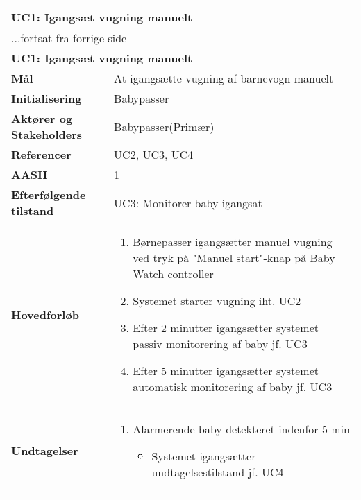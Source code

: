 \begin{center} \centering \label{kravspec:uc1}
	\begin{longtable}{|p{5cm}|p{9cm}|}  %
	\hline
		\multicolumn{2}{|l|}{\textbf{UC1: Igangsæt vugning manuelt}} \\\hline %
		\endfirsthead
		
		\multicolumn{2}{l}{...fortsat fra forrige side} \\ \hline %
		\multicolumn{2}{|l|}{\textbf{UC1: Igangsæt vugning manuelt}} \\\hline %
		\endhead	
		
		\textbf{Mål}							&At igangsætte vugning af barnevogn manuelt 		\\\hline
		\textbf{Initialisering}				&Babypasser		\\\hline
		\textbf{Aktører og Stakeholders}		&Babypasser(Primær)		\\\hline 
		\textbf{Referencer}					&UC2, UC3, UC4		\\\hline
		\textbf{AASH}						&1		\\\hline
		\textbf{Efterfølgende tilstand}		&UC3: Monitorer baby igangsat		\\\hline
		\textbf{Hovedforløb}					
			&\begin{enumerate}
	
				\item Børnepasser igangsætter manuel vugning ved tryk på "Manuel start"-knap på Baby Watch controller
				
				\item \label{kravspec:uc1_vugning}Systemet starter vugning iht. UC2
				
				\item \label{kravspec:uc1_timeout2}Efter 2 minutter igangsætter systemet passiv monitorering af baby jf. UC3			
								
				\item \label{kravspec:uc1_timeout5}Efter 5 minutter igangsætter systemet automatisk monitorering af baby jf. UC3	
				\newline [Und: \ref{kravspec:uc1_timeout5}.a Alarmerende baby detekteret indenfor 5 min]				
				
			\end{enumerate}
		\\\hline
		\textbf{Undtagelser}
			&\begin{enumerate}[label=\ref{kravspec:uc4_autovugning}.a]
			\item Alarmerende baby detekteret indenfor 5 min
					\begin{itemize}
					
					\item Systemet igangsætter undtagelsestilstand jf. UC4
					
					\end{itemize}
			\end{enumerate}
			
		\\\hline
	\end{longtable} 
\end{center}

